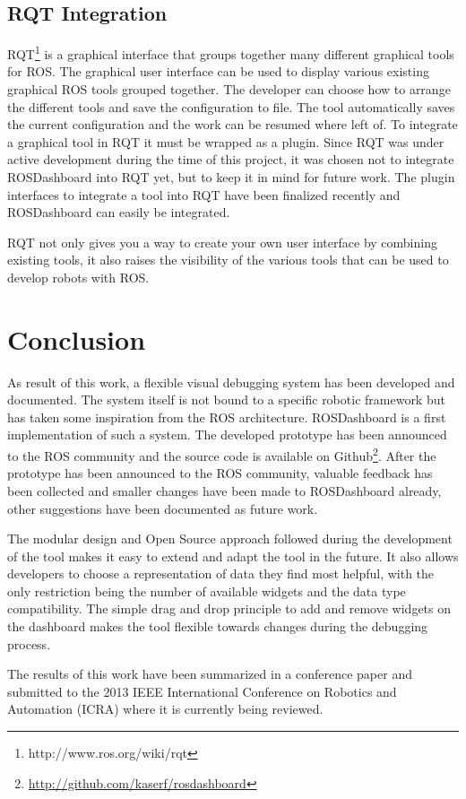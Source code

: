 \subsection{RQT Integration}

RQT\footnote{http://www.ros.org/wiki/rqt} is a graphical interface that groups together many different graphical tools for ROS. The graphical user interface can be used to display various existing graphical ROS tools grouped together. The developer can choose how to arrange the different tools and save the configuration to file. The tool automatically saves the current configuration and the work can be resumed where left of. To integrate a graphical tool in RQT it must be wrapped as a plugin.
Since RQT was under active development during the time of this project, it was chosen not to integrate ROSDashboard into RQT yet, but to keep it in mind for future work. The plugin interfaces to integrate a tool into RQT have been finalized recently and ROSDashboard can easily be integrated.

RQT not only gives you a way to create your own user interface by combining existing tools, it also raises the visibility of the various tools that can be used to develop robots with ROS.

\section{Conclusion}

As result of this work, a flexible visual debugging system has been developed and documented. The system itself is not bound to a specific robotic framework but has taken some inspiration from the ROS architecture. ROSDashboard is a first implementation of such a system. The developed prototype has been announced to the ROS community and the source code is available on Github\footnote{\url{http://github.com/kaserf/rosdashboard}}. After the prototype has been announced to the ROS community, valuable feedback has been collected and smaller changes have been made to ROSDashboard already, other suggestions have been documented as future work.

The modular design and Open Source approach followed during the development of the tool makes it easy to extend and adapt the tool in the future. It also allows developers to choose a representation of data they find most helpful, with the only restriction being the number of available widgets and the data type compatibility. The simple drag and drop principle to add and remove widgets on the dashboard makes the tool flexible towards changes during the debugging process.


The results of this work have been summarized in a conference paper and submitted to the 2013 IEEE International Conference on Robotics and Automation (ICRA) where it is currently being reviewed.
